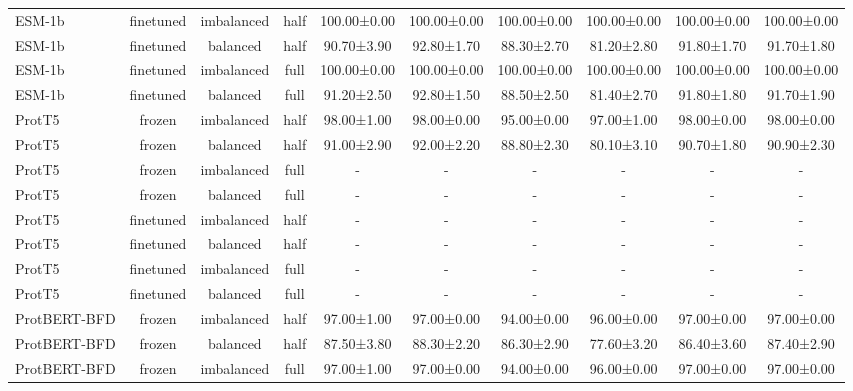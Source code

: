 \begin{tabular}{lccccccccc}
      ESM-1b &      finetuned & imbalanced &      half & 100.00±0.00 & 100.00±0.00 & 100.00±0.00 & 100.00±0.00 & 100.00±0.00 & 100.00±0.00 \\
      ESM-1b &      finetuned &   balanced &      half &  90.70±3.90 &  92.80±1.70 &  88.30±2.70 &  81.20±2.80 &  91.80±1.70 &  91.70±1.80 \\
      ESM-1b &      finetuned & imbalanced &      full & 100.00±0.00 & 100.00±0.00 & 100.00±0.00 & 100.00±0.00 & 100.00±0.00 & 100.00±0.00 \\
      ESM-1b &      finetuned &   balanced &      full &  91.20±2.50 &  92.80±1.50 &  88.50±2.50 &  81.40±2.70 &  91.80±1.80 &  91.70±1.90 \\
      ProtT5 &         frozen & imbalanced &      half &  98.00±1.00 &  98.00±0.00 &  95.00±0.00 &  97.00±1.00 &  98.00±0.00 &  98.00±0.00 \\
      ProtT5 &         frozen &   balanced &      half &  91.00±2.90 &  92.00±2.20 &  88.80±2.30 &  80.10±3.10 &  90.70±1.80 &  90.90±2.30 \\
      ProtT5 &         frozen & imbalanced &      full &           - &           - &           - &           - &           - &           - \\
      ProtT5 &         frozen &   balanced &      full &           - &           - &           - &           - &           - &           - \\
      ProtT5 &      finetuned & imbalanced &      half &           - &           - &           - &           - &           - &           - \\
      ProtT5 &      finetuned &   balanced &      half &           - &           - &           - &           - &           - &           - \\
      ProtT5 &      finetuned & imbalanced &      full &           - &           - &           - &           - &           - &           - \\
      ProtT5 &      finetuned &   balanced &      full &           - &           - &           - &           - &           - &           - \\
ProtBERT-BFD &         frozen & imbalanced &      half &  97.00±1.00 &  97.00±0.00 &  94.00±0.00 &  96.00±0.00 &  97.00±0.00 &  97.00±0.00 \\
ProtBERT-BFD &         frozen &   balanced &      half &  87.50±3.80 &  88.30±2.20 &  86.30±2.90 &  77.60±3.20 &  86.40±3.60 &  87.40±2.90 \\
ProtBERT-BFD &         frozen & imbalanced &      full &  97.00±1.00 &  97.00±0.00 &  94.00±0.00 &  96.00±0.00 &  97.00±0.00 &  97.00±0.00 \\

\end{tabular}
